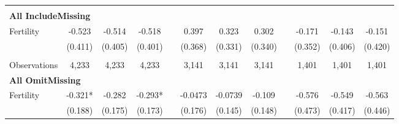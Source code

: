\begin{landscape}
\begin{table}[htpb!]
\begin{center}
\begin{tabular}{lcccp{2mm}cccp{2mm}ccc}
\begin{footnotesize}\end{footnotesize}\\ 
\multicolumn{12}{l}{\textbf{All IncludeMissing}}\\ 
Fertility&-0.523&-0.514&-0.518&&0.397&0.323&0.302&&-0.171&-0.143&-0.151\\
&(0.411)&(0.405)&(0.401)&&(0.368)&(0.331)&(0.340)&&(0.352)&(0.406)&(0.420)\\
\begin{footnotesize}\end{footnotesize}&\begin{footnotesize}\end{footnotesize}&\begin{footnotesize}\end{footnotesize}&\begin{footnotesize}\end{footnotesize}&\begin{footnotesize}\end{footnotesize}&\begin{footnotesize}\end{footnotesize}&\begin{footnotesize}\end{footnotesize}&\begin{footnotesize}\end{footnotesize}&\begin{footnotesize}\end{footnotesize}&\begin{footnotesize}\end{footnotesize}&\begin{footnotesize}\end{footnotesize}&\begin{footnotesize}\end{footnotesize}\\Observations&4,233&4,233&4,233&&3,141&3,141&3,141&&1,401&1,401&1,401\\
\multicolumn{12}{l}{\textbf{All OmitMissing}}\\ 
Fertility&-0.321*&-0.282&-0.293*&&-0.0473&-0.0739&-0.109&&-0.576&-0.549&-0.563\\
&(0.188)&(0.175)&(0.173)&&(0.176)&(0.145)&(0.148)&&(0.473)&(0.417)&(0.446)\\

\end{tabular}
\end{center}
\end{table}
\end{landscape}

